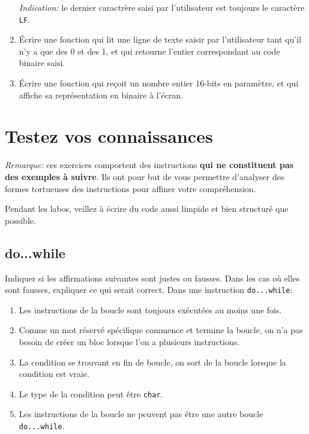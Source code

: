 \begin{multicols}{2}
\begin{enumerate}[label=(\roman*)]
    \emph{Indication:} le dernier caractrère saisi par l'utilisateur est toujours le caractère \lstinline{LF}.

    \item Écrire une fonction qui lit une ligne de texte saisir par l'utilisateur tant qu'il n'y a que des 0 et des 1, et qui retourne l'entier correspondant au code binaire saisi.

    \item Écrire une fonction qui reçoit un nombre entier 16-bits en paramètre, et qui affiche sa représentation  en binaire à l'écran.
\end{enumerate}

\section{Testez vos connaissances}

\emph{Remarque:} ces exercices comportent des instructions \textbf{qui ne constituent pas des exemples à suivre}. Ils ont pour but de vous permettre d’analyser des formes tortueuses des instructions pour affiner votre compréhension.

Pendant les labos, veillez à écrire du code aussi limpide et bien structuré que possible.

\subsection{do...while}

Indiquer si les affirmations suivantes sont justes ou fausses. Dans les cas où elles sont fausses, expliquer ce qui serait correct. Dans une instruction \lstinline{do...while}:

\begin{enumerate}[label=(\roman*)]
    \item Les instructions de la boucle sont toujours exécutées au moins une fois.
    \item Comme un mot réservé spécifique commence et termine la boucle, on n'a pas besoin de créer un bloc lorsque l'on a plusieurs instructions.
    \item La condition se trouvant en fin de boucle, on sort de la boucle lorsque la condition est vraie.
    \item Le type de la condition peut être \lstinline{char}.
    \item Les instructions de la boucle ne peuvent pas être une autre boucle \lstinline{do...while}.
\end{enumerate}


\end{multicols}
